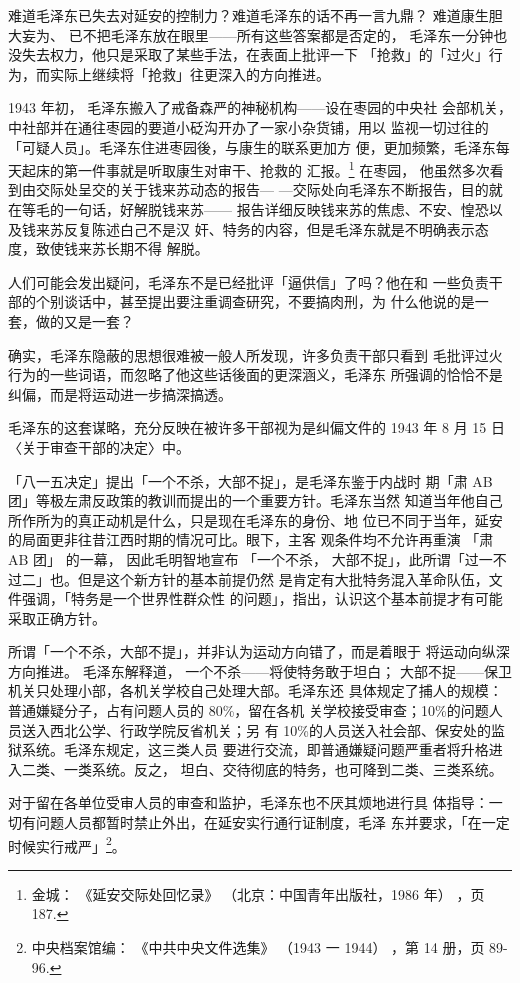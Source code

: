 难道毛泽东已失去对延安的控制力？难道毛泽东的话不再一言九鼎？
难道康生胆大妄为、
已不把毛泽东放在眼里——所有这些答案都是否定的，
毛泽东一分钟也没失去权力，他只是采取了某些手法，在表面上批评一下
「抢救」的「过火」行为，而实际上继续将「抢救」往更深入的方向推进。

1943 年初，
毛泽东搬入了戒备森严的神秘机构——设在枣园的中央社
会部机关，中社部并在通往枣园的要道小砭沟开办了一家小杂货铺，用以
监视一切过往的「可疑人员」。毛泽东住进枣园後，与康生的联系更加方
便，更加频繁，毛泽东每天起床的第一件事就是听取康生对审干、抢救的
汇报。\footnote{金城：
《延安交际处回忆录》
（北京：中国青年出版社，1986 年）
，页 187.} 在枣园，
他虽然多次看到由交际处呈交的关于钱来苏动态的报告—
—交际处向毛泽东不断报告，目的就在等毛的一句话，好解脱钱来苏——
报告详细反映钱来苏的焦虑、不安、惶恐以及钱来苏反复陈述白己不是汉
奸、特务的内容，但是毛泽东就是不明确表示态度，致使钱来苏长期不得
解脱。

人们可能会发出疑问，毛泽东不是已经批评「逼供信」了吗？他在和
一些负责干部的个别谈话中，甚至提出要注重调查研究，不要搞肉刑，为
什么他说的是一套，做的又是一套？

确实，毛泽东隐蔽的思想很难被一般人所发现，许多负责干部只看到
毛批评过火行为的一些词语，而忽略了他这些话後面的更深涵义，毛泽东
所强调的恰恰不是纠偏，而是将运动进一步搞深搞透。

毛泽东的这套谋略，充分反映在被许多干部视为是纠偏文件的 1943
年 8 月 15 日〈关于审查干部的决定〉中。

「八一五决定」提出「一个不杀，大部不捉」，是毛泽东鉴于内战时
期「肃 AB 团」等极左肃反政策的教训而提出的一个重要方针。毛泽东当然
知道当年他自己所作所为的真正动机是什么，只是现在毛泽东的身份、地
位已不同于当年，延安的局面更非往昔江西时期的情况可比。眼下，主客
观条件均不允许再重演
「肃 AB 团」
的一幕，
因此毛明智地宣布
「一个不杀，
大部不捉」，此所谓「过一不过二」也。但是这个新方针的基本前提仍然
是肯定有大批特务混入革命队伍，文件强调，「特务是一个世界性群众性
的问题」，指出，认识这个基本前提才有可能采取正确方针。

所谓「一个不杀，大部不提」，并非认为运动方向错了，而是着眼于
将运动向纵深方向推进。
毛泽东解释道，
一个不杀——将使特务敢于坦白；
大部不捉——保卫机关只处理小部，各机关学校自己处理大部。毛泽东还
具体规定了捕人的规模：普通嫌疑分子，占有问题人员的 80\%，留在各机
关学校接受审查；10\%的问题人员送入西北公学、行政学院反省机关；另
有 10\%的人员送入社会部、保安处的监狱系统。毛泽东规定，这三类人员
要进行交流，即普通嫌疑问题严重者将升格进入二类、一类系统。反之，
坦白、交待彻底的特务，也可降到二类、三类系统。

对于留在各单位受审人员的审查和监护，毛泽东也不厌其烦地进行具
体指导：一切有问题人员都暂时禁止外出，在延安实行通行证制度，毛泽
东并要求，「在一定时候实行戒严」\footnote{中央档案馆编：
《中共中央文件选集》
（1943 一 1944）
，第 14 册，页 89-96.}。

